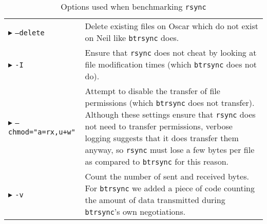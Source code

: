 \documentclass[11pt]{llncs}
\newcommand{\btrsync}{\texttt{btrsync}\xspace}
\newcommand{\rsync}{\texttt{rsync}\xspace}
\begin{document}
\begin{table}
  \begin{tabular}{p{} p{}}
    \toprule
    $\blacktriangleright$ {\tt --delete} & Delete existing files on Oscar which
    do not exist on Neil like \btrsync does.\\
    $\blacktriangleright$ {\tt -I} & Ensure that \rsync does not cheat by
    looking at file modification times (which \btrsync does not do).\\
    $\blacktriangleright$ {\tt --chmod="a=rx,u+w"} & Attempt to disable the
    transfer of file permissions (which \btrsync does not transfer). Although
    these settings ensure that \rsync does not need to transfer permissions,
    verbose logging suggests that it does transfer them anyway, so \rsync must
    lose a few bytes per file as compared to \btrsync for this
    reason.\\
    $\blacktriangleright$ {\tt -v} & Count the number of sent and received
    bytes. For \btrsync we added a piece of code counting the amount of data
    transmitted during \btrsync's own negotiations.\\
    \bottomrule
  \end{tabular}
  \caption{Options used when benchmarking \rsync}
  \label{tab:rsyncopt}
\end{table}
\end{document}
